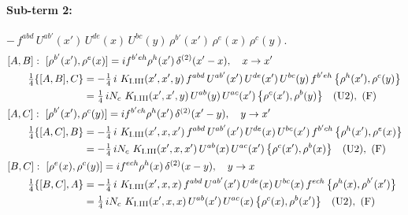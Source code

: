 \documentclass[10pt]{article}
\numberwithin{equation}{section}
\begin{document}
\paragraph{Sub-term 2:} $-\,f^{abd}\,U^{ab'}(x')\,U^{de}(x)\,U^{bc}(y)\,\rho^{b'}(x')\,\rho^{e}(x)\,\rho^{c}(y)$.
\begin{align}
&[A,B]:\ [\rho^{b'}(x'),\rho^{e}(x)]=i f^{b'eh}\rho^{h}(x')\,\delta^{(2)}(x'-x),\quad x\to x'\notag\\
&\qquad \tfrac14\{[A,B],C\}=-\tfrac14\,i\,\,K_{\rm I.III}(x',x',y)\,f^{abd}\,U^{ab'}(x')\,U^{de}(x')\,U^{bc}(y)\,f^{b'eh}\,\big\{\rho^{h}(x'),\rho^{c}(y)\big\}\notag\\
&\qquad\phantom{\tfrac14\{[A,B],C\}}=\tfrac14\,i N_{c}\,\,K_{\rm I.III}(x',x',y)\,U^{ab}(y)\,U^{ac}(x')\,\big\{\rho^{c}(x'),\rho^{b}(y)\big\}\quad\text{(U2)},\ \text{(F)}
\label{R:eq:GI.III-2-AB}\\
&[A,C]:\ [\rho^{b'}(x'),\rho^{c}(y)]=i f^{b'ch}\rho^{h}(x')\,\delta^{(2)}(x'-y),\quad y\to x'\notag\\
&\qquad \tfrac14\{[A,C],B\}=-\tfrac14\,i\,\,K_{\rm I.III}(x',x,x')\,f^{abd}\,U^{ab'}(x')\,U^{de}(x)\,U^{bc}(x')\,f^{b'ch}\,\big\{\rho^{h}(x'),\rho^{e}(x)\big\}\notag\\
&\qquad\phantom{\tfrac14\{[A,C],B\}}=-\tfrac14\,i N_{c}\,\,K_{\rm I.III}(x',x,x')\,U^{ab}(x)\,U^{ac}(x')\,\big\{\rho^{c}(x'),\rho^{b}(x)\big\}\quad\text{(U2)},\ \text{(F)}
\label{R:eq:GI.III-2-AC}\\
&[B,C]:\ [\rho^{e}(x),\rho^{c}(y)]=i f^{ech}\rho^{h}(x)\,\delta^{(2)}(x-y),\quad y\to x\notag\\
&\qquad \tfrac14\{[B,C],A\}=-\tfrac14\,i\,\,K_{\rm I.III}(x',x,x)\,f^{abd}\,U^{ab'}(x')\,U^{de}(x)\,U^{bc}(x)\,f^{ech}\,\big\{\rho^{h}(x),\rho^{b'}(x')\big\}\notag\\
&\qquad\phantom{\tfrac14\{[B,C],A\}}=\tfrac14\,i N_{c}\,\,K_{\rm I.III}(x',x,x)\,U^{ab}(x')\,U^{ac}(x)\,\big\{\rho^{c}(x),\rho^{b}(x')\big\}\quad\text{(U2)},\ \text{(F)}
\label{R:eq:GI.III-2-BC}
\end{align}
\end{document}
